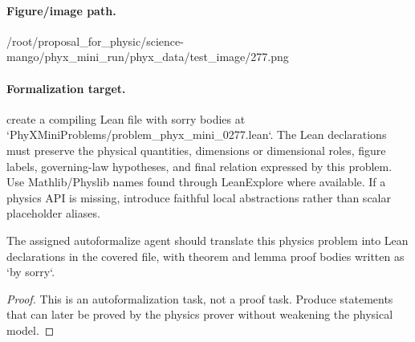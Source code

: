 \paragraph{Figure/image path.}
/root/proposal\_for\_physic/science-mango/phyx\_mini\_run/phyx\_data/test\_image/277.png

\paragraph{Formalization target.}
create a compiling Lean file with sorry bodies at `PhyXMiniProblems/problem\_phyx\_mini\_0277.lean`. The Lean declarations must preserve the physical quantities, dimensions or dimensional roles, figure labels, governing-law hypotheses, and final relation expressed by this problem.
Use Mathlib/Physlib names found through LeanExplore where available. If a physics API is missing, introduce faithful local abstractions rather than scalar placeholder aliases.

\begin{theorem}
\label{thm:physics:phyx_mini_0277:target}
The assigned autoformalize agent should translate this physics problem into Lean declarations in the covered file, with theorem and lemma proof bodies written as `by sorry`.
\end{theorem}
\begin{proof}
This is an autoformalization task, not a proof task. Produce statements that can later be proved by the physics prover without weakening the physical model.
\end{proof}

